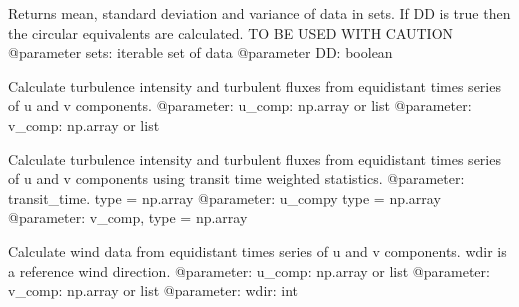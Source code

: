 \documentclass[letterpaper,10pt,english]{sphinxmanual}
\begin{document}

\begin{fulllineitems}
\label{\detokenize{index:windtunnel.calc_stats}}
Returns mean, standard deviation and variance of data in sets. If DD is 
true then the circular equivalents are calculated. TO BE USED WITH CAUTION
@parameter sets: iterable set of data
@parameter DD: boolean

\end{fulllineitems}


\begin{fulllineitems}
\label{\detokenize{index:windtunnel.calc_turb_data}}
Calculate turbulence intensity and turbulent fluxes from equidistant
times series of u and v components.
@parameter: u\_comp: np.array or list
@parameter: v\_comp: np.array or list

\end{fulllineitems}


\begin{fulllineitems}
\label{\detokenize{index:windtunnel.calc_turb_data_wght}}
Calculate turbulence intensity and turbulent fluxes from equidistant
times series of u and v components using transit time weighted statistics.
@parameter: transit\_time. type = np.array
@parameter: u\_compy type = np.array
@parameter: v\_comp, type = np.array

\end{fulllineitems}


\begin{fulllineitems}
\label{\detokenize{index:windtunnel.calc_wind_stats}}
Calculate wind data from equidistant times series of u and 
v components. wdir is a reference wind direction.
@parameter: u\_comp: np.array or list
@parameter: v\_comp: np.array or list
@parameter: wdir: int

\end{fulllineitems}
\end{document}
